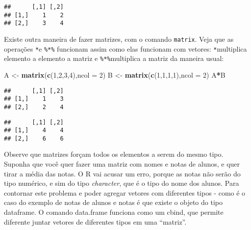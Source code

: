 \documentclass[]{book}
\newenvironment{Shaded}{\begin{snugshade}}{\end{snugshade}}
\newcommand{\KeywordTok}[1]{\textcolor[rgb]{0.13,0.29,0.53}{\textbf{#1}}}
\newcommand{\DataTypeTok}[1]{\textcolor[rgb]{0.13,0.29,0.53}{#1}}
\newcommand{\DecValTok}[1]{\textcolor[rgb]{0.00,0.00,0.81}{#1}}
\newcommand{\StringTok}[1]{\textcolor[rgb]{0.31,0.60,0.02}{#1}}
\newcommand{\OperatorTok}[1]{\textcolor[rgb]{0.81,0.36,0.00}{\textbf{#1}}}
\newcommand{\NormalTok}[1]{#1}
\begin{document}
\begin{verbatim}
##      [,1] [,2]
## [1,]    1    2
## [2,]    3    4
\end{verbatim}

Existe outra maneira de fazer matrizes, com o comando \texttt{matrix}.
Veja que as operações \texttt{*}e \texttt{\%*\%} funcionam assim como
elas funcionam com vetores: \texttt{*}multiplica elemento a elemento a
matriz e \texttt{\%*\%}multiplica a matriz da maneira usual:

\begin{Shaded}
\begin{Highlighting}[]
\NormalTok{A <-}\StringTok{ }\KeywordTok{matrix}\NormalTok{(}\KeywordTok{c}\NormalTok{(}\DecValTok{1}\NormalTok{,}\DecValTok{2}\NormalTok{,}\DecValTok{3}\NormalTok{,}\DecValTok{4}\NormalTok{),}\DataTypeTok{ncol =} \DecValTok{2}\NormalTok{)}
\NormalTok{B <-}\StringTok{ }\KeywordTok{matrix}\NormalTok{(}\KeywordTok{c}\NormalTok{(}\DecValTok{1}\NormalTok{,}\DecValTok{1}\NormalTok{,}\DecValTok{1}\NormalTok{,}\DecValTok{1}\NormalTok{),}\DataTypeTok{ncol =} \DecValTok{2}\NormalTok{)}
\NormalTok{A}\OperatorTok{*}\NormalTok{B}
\end{Highlighting}
\end{Shaded}

\begin{verbatim}
##      [,1] [,2]
## [1,]    1    3
## [2,]    2    4
\end{verbatim}

\begin{Shaded}
\end{Shaded}

\begin{verbatim}
##      [,1] [,2]
## [1,]    4    4
## [2,]    6    6
\end{verbatim}

Observe que matrizes forçam todos os elementos a serem do mesmo tipo.
Suponha que você quer fazer uma matriz com nomes e notas de alunos, e
quer tirar a média das notas. O R vai acusar um erro, porque as notas
não serão do tipo numérico, e sim do tipo \emph{character}, que é o tipo
do nome dos alunos. Para contornar este problema e poder agregar vetores
com diferentes tipos - como é o caso do exemplo de notas de alunos e
notas é que existe o objeto do tipo dataframe. O comando data.frame
funciona como um cbind, que permite diferente juntar vetores de
diferentes tipos em uma ``matriz''.
\end{document}
